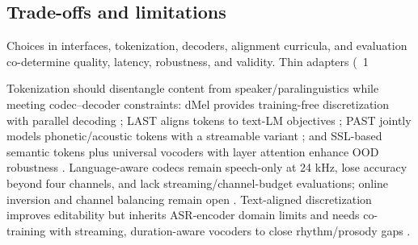 \documentclass{article}
\begin{document}
\subsection{Trade-offs and limitations} \label{subsec:Trade-offs and limitations}

Choices in interfaces, tokenization, decoders, alignment curricula, and evaluation co-determine quality, latency, robustness, and validity. Thin adapters (~1%

Tokenization should disentangle content from speaker/paralinguistics while meeting codec--decoder constraints: dMel provides training-free discretization with parallel decoding \cite{bai2025dmelspeechtokenizationmadesimple}; LAST aligns tokens to text-LM objectives \cite{turetzky2024lastlanguagemodelawarespeechtokenization}; PAST jointly models phonetic/acoustic tokens with a streamable variant \cite{har-tuv2025pastphoneticacousticspeechtokenizer}; and SSL-based semantic tokens plus universal vocoders with layer attention enhance OOD robustness \cite{mousavi2024howshouldweextractdiscreteaudiotokenssel}. Language-aware codecs remain speech-only at 24 kHz, lose accuracy beyond four channels, and lack streaming/channel-budget evaluations; online inversion and channel balancing remain open \cite{ji2025languagecodecbridgingdiscreterepresentat}. Text-aligned discretization improves editability but inherits ASR-encoder domain limits and needs co-training with streaming, duration-aware vocoders to close rhythm/prosody gaps \cite{tsunoo2024decoderonlyarchitecturespeechrecognition}.
\end{document}
